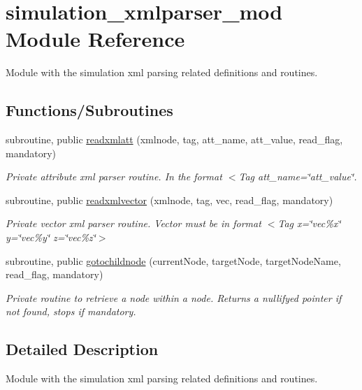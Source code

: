 \hypertarget{namespacesimulation__xmlparser__mod}{}\section{simulation\+\_\+xmlparser\+\_\+mod Module Reference}
\label{namespacesimulation__xmlparser__mod}


Module with the simulation xml parsing related definitions and routines.  


\subsection*{Functions/\+Subroutines}
\begin{DoxyCompactItemize}
\item 
subroutine, public \hyperlink{namespacesimulation__xmlparser__mod_ab062c8e064b043446d4f6ac695b306ab}{readxmlatt} (xmlnode, tag, att\+\_\+name, att\+\_\+value, read\+\_\+flag, mandatory)
\begin{DoxyCompactList}\small\item\em Private attribute xml parser routine. In the format $<$Tag att\+\_\+name=\char`\"{}att\+\_\+value\char`\"{}. \end{DoxyCompactList}\item 
subroutine, public \hyperlink{namespacesimulation__xmlparser__mod_a48bcd153bef2149410d66842b564728d}{readxmlvector} (xmlnode, tag, vec, read\+\_\+flag, mandatory)
\begin{DoxyCompactList}\small\item\em Private vector xml parser routine. Vector must be in format $<$\+Tag x=\char`\"{}vec\%x\char`\"{} y=\char`\"{}vec\%y\char`\"{} z=\char`\"{}vec\%z\char`\"{}$>$ \end{DoxyCompactList}\item 
subroutine, public \hyperlink{namespacesimulation__xmlparser__mod_a3167fcb99b40cdc25d2ba18418bd8b9f}{gotochildnode} (current\+Node, target\+Node, target\+Node\+Name, read\+\_\+flag, mandatory)
\begin{DoxyCompactList}\small\item\em Private routine to retrieve a node within a node. Returns a nullifyed pointer if not found, stops if mandatory. \end{DoxyCompactList}\end{DoxyCompactItemize}


\subsection{Detailed Description}
Module with the simulation xml parsing related definitions and routines. 

